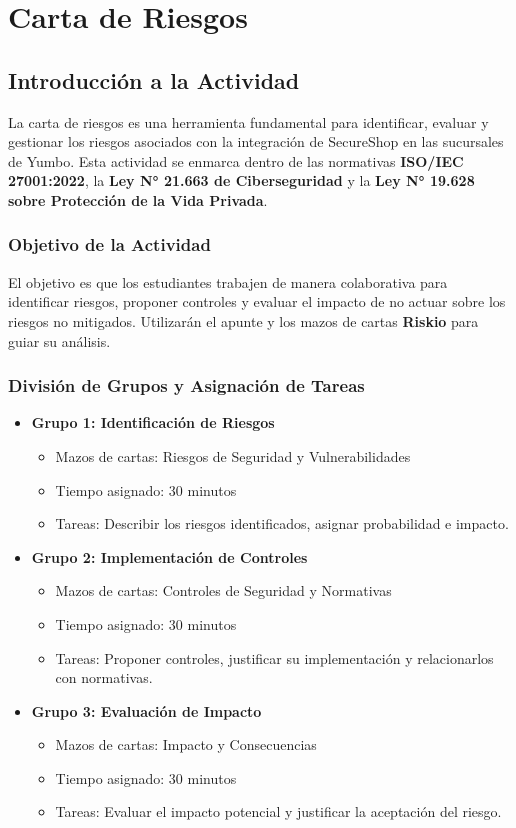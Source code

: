 \chapter{Carta de Riesgos}

\section{Introducción a la Actividad}

La carta de riesgos es una herramienta fundamental para identificar, evaluar y gestionar los riesgos asociados con la integración de SecureShop en las sucursales de Yumbo. Esta actividad se enmarca dentro de las normativas \textbf{ISO/IEC 27001:2022}, la \textbf{Ley N° 21.663 de Ciberseguridad} y la \textbf{Ley N° 19.628 sobre Protección de la Vida Privada}.

\subsection{Objetivo de la Actividad}
El objetivo es que los estudiantes trabajen de manera colaborativa para identificar riesgos, proponer controles y evaluar el impacto de no actuar sobre los riesgos no mitigados. Utilizarán el apunte y los mazos de cartas \textbf{Riskio} para guiar su análisis.

\subsection{División de Grupos y Asignación de Tareas}

\begin{itemize}
  \item \textbf{Grupo 1: Identificación de Riesgos}
    \begin{itemize}
      \item Mazos de cartas: Riesgos de Seguridad y Vulnerabilidades
      \item Tiempo asignado: 30 minutos
      \item Tareas: Describir los riesgos identificados, asignar probabilidad e impacto.
    \end{itemize}
  \item \textbf{Grupo 2: Implementación de Controles}
    \begin{itemize}
      \item Mazos de cartas: Controles de Seguridad y Normativas
      \item Tiempo asignado: 30 minutos
      \item Tareas: Proponer controles, justificar su implementación y relacionarlos con normativas.
    \end{itemize}
  \item \textbf{Grupo 3: Evaluación de Impacto}
    \begin{itemize}
      \item Mazos de cartas: Impacto y Consecuencias
      \item Tiempo asignado: 30 minutos
      \item Tareas: Evaluar el impacto potencial y justificar la aceptación del riesgo.
    \end{itemize}
\end{itemize}


